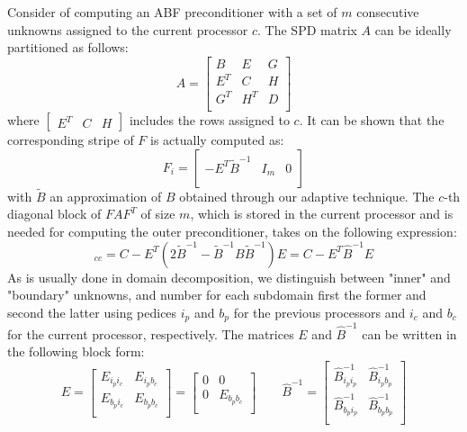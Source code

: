 \documentclass{report}
\begin{document}
Consider of computing an ABF preconditioner with a set of $m$ consecutive
unknowns assigned
to the current processor $c$. The SPD matrix $A$ can be ideally partitioned as follows:
\begin{equation}
A = \left[
\begin{array}{ccc}
B & E & G \\
E^T & C & H \\
G^T & H^T & D \\
\end{array}
\right]
\end{equation}
where $\left[ \begin{array}{ccc} E^T & C & H \end{array} \right]$ includes the rows
assigned to $c$. It can be shown that the corresponding stripe of $F$ is
actually computed as:
\begin{equation}
F_i = \left[
\begin{array}{ccc}
-E^T \tilde{B}^{-1} & I_m & 0 \\
\end{array}
\right]
\end{equation}
with $\tilde{B}$ an approximation of $B$ obtained through our adaptive technique.
The $c$-th diagonal block of $FAF^T$ of size $m$, which is stored in the
current processor and is
needed for computing the outer preconditioner, takes on the following expression:
\begin{equation}
[FAF^T]_{cc} = C - E^T(2 \tilde{B}^{-1} - \tilde{B}^{-1} B \tilde{B}^{-1}
) E = C - E^T \hat{B}^{-1} E
\end{equation}
As is usually done in domain decomposition, we distinguish between
"inner" and "boundary" unknowns,
and number for each subdomain first the former and second the latter
using pedices $i_p$ and $b_p$ for
the previous processors and $i_c$ and $b_c$ for the current processor, respectively.
The matrices $E$ and $\hat{B}^{-1}$ can be written in the following block form:
\begin{equation}
E = \left[
\begin{array}{cc}
E_{i_p i_c} & E_{i_p b_c} \\
E_{b_p i_c} & E_{b_p b_c} \\
\end{array}
\right] = \left[
\begin{array}{cc}
0 & 0 \\
0 & E_{b_p b_c} \\
\end{array}
\right]
\qquad
\hat{B}^{-1} = \left[
\begin{array}{cc}
\hat{B}^{-1}_{i_p i_p} & \hat{B}^{-1}_{i_p b_p} \\
\hat{B}^{-1}_{b_p i_p} & \hat{B}^{-1}_{b_p b_p} \\
\end{array}
\right]
\label{blkEq}
\end{equation}
\end{document}

